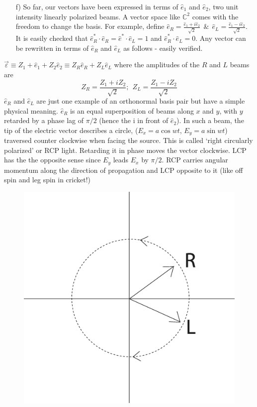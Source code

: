 \begin{itemize}
\item[f)] So far, our vectors have been expressed in terms of $\hat{e}_1$ and $\hat{e}_2$, two unit intensity
linearly polarized beams. A vector space like $\mathbb{C}^2$ comes with the freedom to
change the basis. For example, define $\hat{e}_R = \frac{\hat{e}_1 + i \hat{e}_2}{\sqrt{2}} ~~\&~~ \hat{e}_L = \frac{\hat{e}_1 - i \hat{e}_2}{\sqrt{2}}$. It is easily
checked that $\hat{e}^{\ast}_R  \cdot \hat{e}_R = \hat{e}^{\ast} \cdot \hat{e}_L = 1$ and $\hat{e}^{\ast}_R \cdot \hat{e}_L = 0$. Any vector can be rewritten
in terms of $\hat{e}_R$ and $\hat{e}_L$ as follows - easily verified.
\end{itemize}


$\overrightarrow{\varepsilon} \equiv Z_1 + \hat{e}_1 + Z_2 \hat{e}_2  \equiv Z_R \hat{e}_R + Z_L \hat{e}_L$ where the amplitudes of the $R$ and $L$ beams are 
$$
Z_R  = \dfrac{Z_1 + iZ_2}{\sqrt{2}} ; ~~ Z_L = \dfrac{Z_1 - iZ_2}{\sqrt{2}}
$$
$\hat{e}_R$ and $\hat{e}_L$ are just one example of an orthonormal basis pair but have a simple
physical meaning. $\hat{e}_R$ is an equal superposition of beams along $x$ and $y$, with
$y$ retarded by a phase lag of $\pi/2$ (hence the i in front of $\hat{e}_2$). In such a beam,
the tip of the electric vector describes a circle, ($E_x = a \cos wt$, $E_y = a \sin wt$)
traversed counter clockwise when facing the source. This is called `right circularly polarized' or RCP light. Retarding it in phase moves the vector clockwise.
LCP has the the opposite sense since $E_y$ leads $E_x$ by $\pi/2$. RCP carries angular
momentum along the direction of propagation and LCP opposite to it (like off
spin and leg spin in cricket!)
\begin{figure}[H]
\centering
\includegraphics[scale=0.15]{src/images/chap26/2.eps}
\end{figure}

